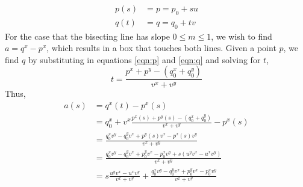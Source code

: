 \documentclass{egpubl}
\begin{document}
\begin{align}
p(s) &= p = p_0 + su \label{eqn:p} \\
q(t) &= q = q_0 + tv \label{eqn:q}
\end{align}
For the case that the bisecting line has slope $0 \le m \le 1$, we wish to find $a = q^x-p^x$, which results in a box that touches both lines. Given a point $p$, we find $q$ by substituting in equations \eqref{eqn:p} and \eqref{eqn:q} and solving for $t$,
\begin{equation}
\label{eqn:abc}
t = \frac{p^x+p^y-(q_0^x+q_0^y)}{v^x+v^y}
\end{equation}
Thus,
\begin{align} 
a(s) &= q^x(t) - p^x(s) \nonumber \\
   &= q_0^x + v^x\frac{p^x(s)+p^y(s)-(q_0^x+q_0^y)}{v^x+v^y} - p^x(s) \nonumber \\
   &= \frac{q_0^xv^y-q_0^yv^x+p^y(s)v^x-p^x(s)v^y}{v^x+v^y} \nonumber \\
   &= \frac{q_0^xv^y-q_0^yv^x+p_0^yv^x-p_0^xv^y+s(u^yv^x-u^xv^y)}{v^x+v^y} \nonumber \\
   &= s\frac{u^yv^x-u^xv^y}{v^x+v^y}+\frac{q_0^xv^y-q_0^yv^x+p_0^yv^x-p_0^xv^y}{v^x+v^y} \label{eqn:a}
\end{align}

\end{document}
